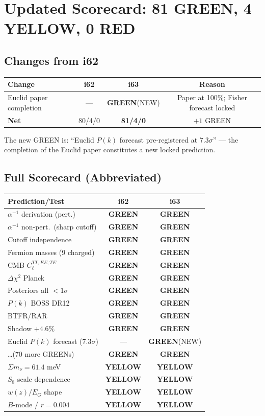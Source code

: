 \documentclass[11pt,a4paper]{article}
\newcommand{\GREEN}{\textcolor{dfdgreen}{\textbf{GREEN}}}
\newcommand{\YELLOW}{\textcolor{dfdyellow}{\textbf{YELLOW}}}
\begin{document}
\section{Updated Scorecard: 81 GREEN, 4 YELLOW, 0 RED}

\subsection{Changes from i62}

\begin{center}
\begin{tabular}{lccc}
\toprule
\textbf{Change} & \textbf{i62} & \textbf{i63} & \textbf{Reason} \\
\midrule
Euclid paper completion & --- & \GREEN (NEW) & Paper at 100\%; Fisher forecast locked \\
\midrule
\textbf{Net} & 80/4/0 & \textbf{81/4/0} & $+1$ GREEN \\
\bottomrule
\end{tabular}
\end{center}

The new GREEN is: ``Euclid $P(k)$ forecast pre-registered at $7.3\sigma$'' --- the completion of the Euclid paper constitutes a new locked prediction.

\subsection{Full Scorecard (Abbreviated)}

\begin{center}
\begin{longtable}{p{5cm}cc}
\toprule
\textbf{Prediction/Test} & \textbf{i62} & \textbf{i63} \\
\midrule
$\alpha^{-1}$ derivation (pert.) & \GREEN & \GREEN \\
$\alpha^{-1}$ non-pert.\ (sharp cutoff) & \GREEN & \GREEN \\
Cutoff independence & \GREEN & \GREEN \\
Fermion masses (9 charged) & \GREEN & \GREEN \\
CMB $C_\ell^{TT,EE,TE}$ & \GREEN & \GREEN \\
$\Delta\chi^2$ Planck & \GREEN & \GREEN \\
Posteriors all $< 1\sigma$ & \GREEN & \GREEN \\
$P(k)$ BOSS DR12 & \GREEN & \GREEN \\
BTFR/RAR & \GREEN & \GREEN \\
Shadow $+4.6\%$ & \GREEN & \GREEN \\
Euclid $P(k)$ forecast ($7.3\sigma$) & --- & \GREEN (NEW) \\
\ldots (70 more GREENs) & \GREEN & \GREEN \\
\midrule
$\Sigma m_\nu = 61.4$ meV & \YELLOW & \YELLOW \\
$S_8$ scale dependence & \YELLOW & \YELLOW \\
$w(z)/E_G$ shape & \YELLOW & \YELLOW \\
$B$-mode / $r = 0.004$ & \YELLOW & \YELLOW \\
\bottomrule
\end{longtable}
\end{center}
\end{document}
